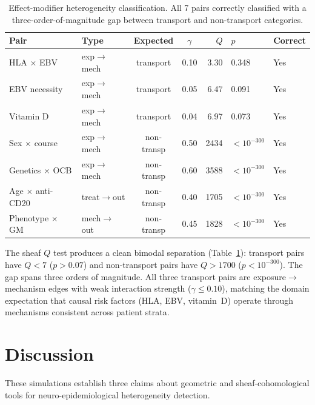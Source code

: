 \documentclass[11pt]{article}
\begin{document}
\begin{table}[htbp]
\centering
\caption{Effect-modifier heterogeneity classification. All 7 pairs
correctly classified with a three-order-of-magnitude gap between
transport and non-transport categories.}
\label{tab:p3}
\begin{tabular}{@{}llccrll@{}}
\toprule
Pair & Type & Expected & $\gamma$ & $Q$ & $p$ & Correct \\
\midrule
HLA $\times$ EBV & exp$\to$mech & transport & 0.10 & 3.30 & 0.348 & Yes \\
EBV necessity & exp$\to$mech & transport & 0.05 & 6.47 & 0.091 & Yes \\
Vitamin D & exp$\to$mech & transport & 0.04 & 6.97 & 0.073 & Yes \\
\midrule
Sex $\times$ course & exp$\to$mech & non-transp & 0.50 & 2434 & $< 10^{-300}$ & Yes \\
Genetics $\times$ OCB & exp$\to$mech & non-transp & 0.60 & 3588 & $< 10^{-300}$ & Yes \\
Age $\times$ anti-CD20 & treat$\to$out & non-transp & 0.40 & 1705 & $< 10^{-300}$ & Yes \\
Phenotype $\times$ GM & mech$\to$out & non-transp & 0.45 & 1828 & $< 10^{-300}$ & Yes \\
\bottomrule
\end{tabular}
\end{table}

The sheaf $Q$ test produces a clean bimodal separation
(Table~\ref{tab:p3}): transport pairs have $Q < 7$ ($p > 0.07$) and
non-transport pairs have $Q > 1700$ ($p < 10^{-300}$). The gap spans
three orders of magnitude. All three transport pairs are
exposure$\to$mechanism edges with weak interaction strength
($\gamma \leq 0.10$), matching the domain expectation that causal risk
factors (HLA, EBV, vitamin~D) operate through mechanisms consistent
across patient strata.

\section{Discussion}

These simulations establish three claims about geometric and
sheaf-cohomological tools for neuro-epidemiological heterogeneity
detection.
\end{document}

